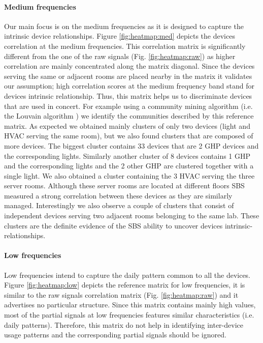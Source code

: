 \paragraph{Medium frequencies}
Our main focus is on the medium frequencies as it is designed to capture the intrinsic device relationships.
Figure \ref{fig:heatmap:med} depicts the devices correlation at the medium frequencies.
This correlation matrix is significantly different from the one of the raw signals (Fig. \ref{fig:heatmap:raw}) as higher correlation are mainly concentrated along the matrix diagonal. 
Since the devices serving the same or adjacent rooms are placed nearby in the matrix it validates our assumption; high correlation scores at the medium frequency band stand for devices intrinsic relationship.
Thus, this matrix helps us to discriminate devices that are used in concert.
For example using a community mining algorithm (i.e. the Louvain algorithm \cite{blondel:unfolding}) we identify the communities described by this reference matrix.
As expected we obtained mainly clusters of only two devices (light and HVAC serving the same room), but we also found clusters that are composed of more devices.
The biggest cluster contains 33 devices that are 2 GHP devices and the corresponding lights.
Similarly another cluster of 8 devices contains 1 GHP and the corresponding lights and the 2 other GHP are clustered together with a single light.
We also obtained a cluster containing the 3 HVAC serving the three server rooms. Although these server rooms are located at different floors SBS measured a strong correlation between these devices as they are similarly managed.
Interestingly we also observe a couple of clusters that consist of independent devices serving two adjacent rooms belonging to the same lab.
These clusters are the definite evidence of the SBS ability to uncover devices intrinsic-relationships.
 
\paragraph{Low frequencies}
Low frequencies intend to capture the daily pattern common to all the devices.
Figure \ref{fig:heatmap:low} depicts the reference matrix for low frequencies, it is similar to the raw signals correlation matrix (Fig. \ref{fig:heatmap:raw}) and it advertises no particular structure.
Since this matrix contains mainly high values, most of the partial signals at low frequencies features similar characteristics (i.e. daily patterns).
Therefore, this matrix do not help in identifying inter-device usage patterns and the corresponding partial signals should be ignored.
 
